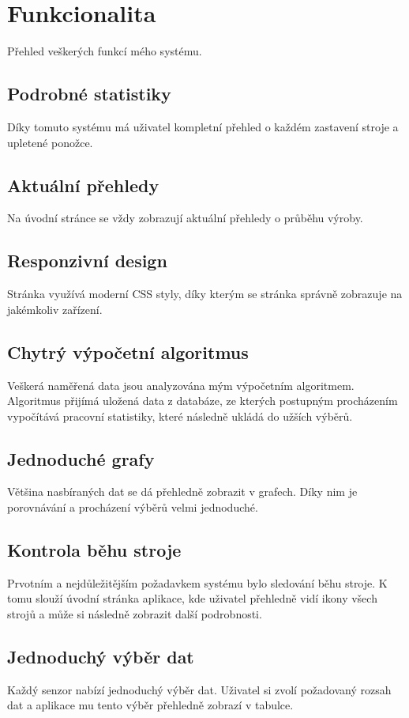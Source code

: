 \section{Funkcionalita}
Přehled veškerých funkcí mého systému.


\subsection{Podrobné statistiky}
Díky tomuto systému má uživatel kompletní přehled o každém zastavení stroje a upletené ponožce.


\subsection{Aktuální přehledy}
Na úvodní stránce se vždy zobrazují aktuální přehledy o průběhu výroby.


\subsection{Responzivní design}
Stránka využívá moderní CSS styly, díky kterým se stránka správně zobrazuje na jakémkoliv zařízení. 


\subsection{Chytrý výpočetní algoritmus}
Veškerá naměřená data jsou analyzována mým výpočetním algoritmem.
Algoritmus přijímá uložená data z databáze, ze kterých postupným procházením vypočítává pracovní statistiky, které následně ukládá do užších výběrů.


\subsection{Jednoduché grafy}
Většina nasbíraných dat se dá přehledně zobrazit v grafech. 
Díky nim je porovnávání a procházení výběrů velmi jednoduché. 


\subsection{Kontrola běhu stroje}
Prvotním a nejdůležitějším požadavkem systému bylo sledování běhu stroje.
K tomu slouží úvodní stránka aplikace, kde uživatel přehledně vidí ikony všech strojů a může si následně zobrazit další podrobnosti. 

\subsection{Jednoduchý výběr dat}
Každý senzor nabízí jednoduchý výběr dat.
Uživatel si zvolí požadovaný rozsah dat a aplikace mu tento výběr přehledně zobrazí v tabulce.


